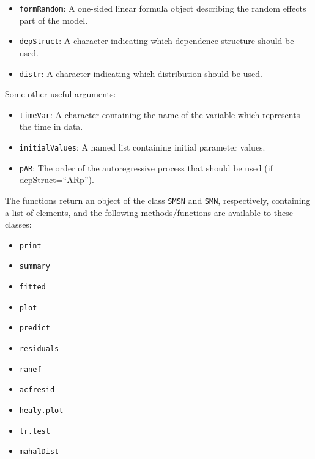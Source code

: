 \documentclass[
  ignorenonframetext,
]{beamer}
\begin{document}
\begin{frame}[fragile]

\begin{itemize}
\item
  \texttt{formRandom}: A one-sided linear formula object describing the
  random effects part of the model.
\item
  \texttt{depStruct}: A character indicating which dependence structure
  should be used.
\item
  \texttt{distr}: A character indicating which distribution should be
  used.\pause
\end{itemize}

Some other useful arguments:

\begin{itemize}
\item
  \texttt{timeVar}: A character containing the name of the variable
  which represents the time in data.
\item
  \texttt{initialValues}: A named list containing initial parameter
  values.
\item
  \texttt{pAR}: The order of the autoregressive process that should be
  used (if depStruct=``ARp'').
\end{itemize}

\end{frame}

\begin{frame}[fragile]

The functions return an object of the class \texttt{SMSN} and
\texttt{SMN}, respectively, containing a list of elements, and the
following methods/functions are available to these classes:

\begin{itemize}
\item
  \texttt{print}
\item
  \texttt{summary}
\item
  \texttt{fitted}
\item
  \texttt{plot}
\item
  \texttt{predict}
\item
  \texttt{residuals}
\item
  \texttt{ranef}
\item
  \texttt{acfresid}
\item
  \texttt{healy.plot}
\item
  \texttt{lr.test}
\item
  \texttt{mahalDist} 
\end{itemize}

\end{frame}
\end{document}
